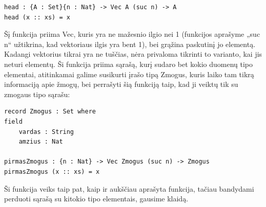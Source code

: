\documentclass{VUMIFPSkursinis}
\begin{document}
\begin{lstlisting}
head : {A : Set}{n : Nat} -> Vec A (suc n) -> A
head (x :: xs) = x
\end{lstlisting}
Šį funkcija priima Vec, kuris yra ne mažesnio ilgio nei 1 (funkcijos aprašyme „suc n“ užtikrina, kad vektoriaus ilgis yra bent 1), bei grąžina paskutinį jo elementą. Kadangi vektorius tikrai yra ne tuščias, nėra privaloma tikrinti to varianto, kai jis neturi elementų. Ši funkcija priima sąrašą, kurį sudaro bet kokio duomenų tipo elementai, atitinkamai galime susikurti įrašo tipą Zmogus, kuris laiko tam tikrą informaciją apie žmogų, bei perrašyti šią funkciją taip, kad ji veiktų tik su zmogaus tipo sąrašu:
\begin{lstlisting}
record Zmogus : Set where
field
	vardas : String
	amzius : Nat

pirmasZmogus : {n : Nat} -> Vec Zmogus (suc n) -> Zmogus
pirmasZmogus (x :: xs) = x	
	\end{lstlisting}
Ši funkcija veiks taip pat, kaip ir aukščiau aprašyta funkcija, tačiau bandydami perduoti sąrašą su kitokio tipo elementais, gausime klaidą.	
\end{document}
